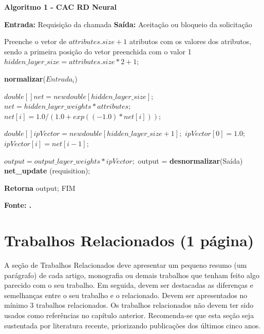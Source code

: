 \begin{center}	
    \textbf{Algoritmo 1 -  CAC RD Neural}
	\vspace{-0.3cm}
\begin{minipage}[ht]{13cm}
\begin{algorithm}[H]
  \footnotesize
  \caption{CAC-RD Neural}
  \label{alg:rnagenerica}
  \begin{algorithmic}[1]
      \STATE \textbf{Entrada:} Requisição da chamada
    \STATE \textbf{Saída:} Aceitação ou bloqueio da solicitação
    
    \STATE Preenche o vetor de $attributes.size+1$ atributos com os valores dos atributos, sendo a primeira posição do vetor preenchida com o valor 1
		\STATE $hidden\_layer\_size =  attributes.size*2+1;$

    	\STATE \textbf{normalizar}($Entrada_i$)
    \ENDFOR

		\STATE $double [] net = new double [hidden\_layer\_size];$
    \STATE $net = hidden\_layer\_weights * attributes;$
			\STATE $net [i] = 1.0 / (1.0 + exp((-1.0)*net[i]));$
		\ENDFOR

		\STATE $double [] ipVector = new double [hidden\_layer\_size+1];$
    \STATE $ipVector [0] = 1.0;$
			\STATE $ipVector [i] = net [i-1];$
		\ENDFOR
		
		\STATE $output = output\_layer\_weights *  ipVector;$
    \STATE output = \textbf{desnormalizar}(Saída)
    \STATE \textbf{net\_update} (requisition);
    
    \STATE \textbf{Retorna} output; FIM
  \end{algorithmic}
\end{algorithm}

\small \centering \textbf{\footnotesize Fonte: .}
\end{minipage}
\end{center}
   
\estrutura\section{\esp Trabalhos Relacionados (1 página)}\instrucao

A seção de Trabalhos Relacionados deve apresentar um pequeno resumo (um parágrafo) de cada artigo, monografia ou demais trabalhos que tenham feito algo parecido com o seu trabalho. Em seguida, devem ser destacadas as diferenças e semelhanças entre o seu trabalho e o relacionado. Devem ser apresentados no mínimo 3 trabalhos relacionados. Os trabalhos relacionados não devem ter sido usados como referências no capítulo anterior. Recomenda-se que esta seção seja sustentada por literatura recente, priorizando publicações dos últimos cinco anos.

